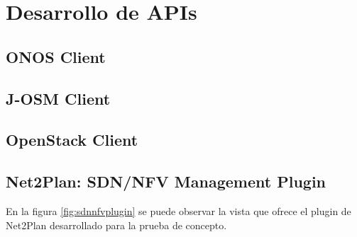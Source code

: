 \chapter{Desarrollo de APIs}

\section{ONOS Client}
\label{sec:onosclient}

\section{J-OSM Client}
\label{sec:osmclient}

\section{OpenStack Client}
\label{sec:openstackclient}

\section{Net2Plan: SDN/NFV Management Plugin}
\label{sec:nfvplugin}

En la figura \ref{fig:sdnnfvplugin} se puede observar la vista que ofrece el plugin de Net2Plan desarrollado para la prueba de concepto.

\cleardoublepage